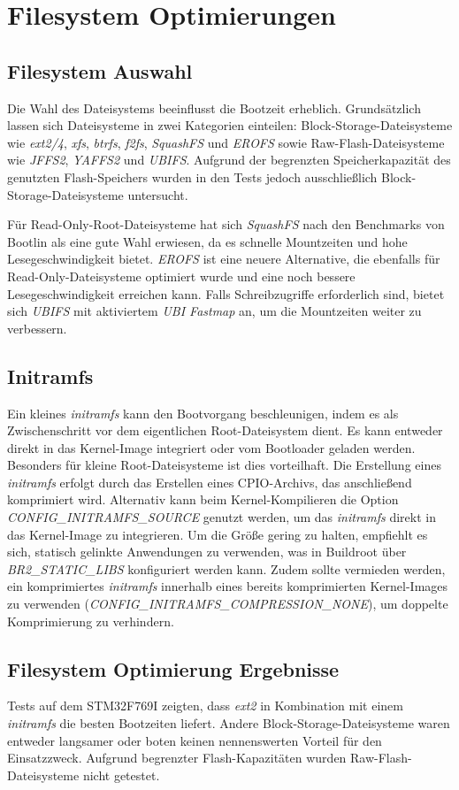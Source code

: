 
\section{Filesystem Optimierungen}

\subsection{Filesystem Auswahl}
Die Wahl des Dateisystems beeinflusst die Bootzeit erheblich. Grundsätzlich lassen sich Dateisysteme in zwei
Kategorien einteilen: Block-Storage-Dateisysteme wie \textit{ext2/4}, \textit{xfs}, \textit{btrfs},
\textit{f2fs}, \textit{SquashFS} und \textit{EROFS} sowie Raw-Flash-Dateisysteme wie \textit{JFFS2},
\textit{YAFFS2} und \textit{UBIFS}. Aufgrund der begrenzten Speicherkapazität des genutzten Flash-Speichers
wurden in den Tests jedoch ausschließlich Block-Storage-Dateisysteme untersucht.

Für Read-Only-Root-Dateisysteme hat sich \textit{SquashFS} nach den Benchmarks von Bootlin als eine gute Wahl
erwiesen, da es schnelle Mountzeiten und hohe Lesegeschwindigkeit bietet. \textit{EROFS} ist eine neuere
Alternative, die ebenfalls für Read-Only-Dateisysteme optimiert wurde und eine noch bessere
Lesegeschwindigkeit erreichen kann. Falls Schreibzugriffe erforderlich sind, bietet sich \textit{UBIFS} mit
aktiviertem \textit{UBI Fastmap} an, um die Mountzeiten weiter zu verbessern.

\subsection{Initramfs}
Ein kleines \textit{initramfs} kann den Bootvorgang beschleunigen, indem es als Zwischenschritt vor dem
eigentlichen Root-Dateisystem dient. Es kann entweder direkt in das Kernel-Image integriert oder vom
Bootloader geladen werden. Besonders für kleine Root-Dateisysteme ist dies vorteilhaft. Die Erstellung eines
\textit{initramfs} erfolgt durch das Erstellen eines CPIO-Archivs, das anschließend komprimiert wird.
Alternativ kann beim Kernel-Kompilieren die Option \textit{CONFIG\_INITRAMFS\_SOURCE} genutzt werden, um das
\textit{initramfs} direkt in das Kernel-Image zu integrieren. Um die Größe gering zu halten, empfiehlt es
sich, statisch gelinkte Anwendungen zu verwenden, was in Buildroot über \textit{BR2\_STATIC\_LIBS}
konfiguriert werden kann. Zudem sollte vermieden werden, ein komprimiertes \textit{initramfs} innerhalb eines
bereits komprimierten Kernel-Images zu verwenden (\textit{CONFIG\_INITRAMFS\_COMPRESSION\_NONE}), um doppelte
Komprimierung zu verhindern.

\subsection{Filesystem Optimierung Ergebnisse}
Tests auf dem STM32F769I zeigten, dass \textit{ext2} in Kombination mit einem \textit{initramfs} die besten
Bootzeiten liefert. Andere Block-Storage-Dateisysteme waren entweder langsamer oder boten keinen nennenswerten
Vorteil für den Einsatzzweck. Aufgrund begrenzter Flash-Kapazitäten wurden Raw-Flash-Dateisysteme nicht
getestet.

